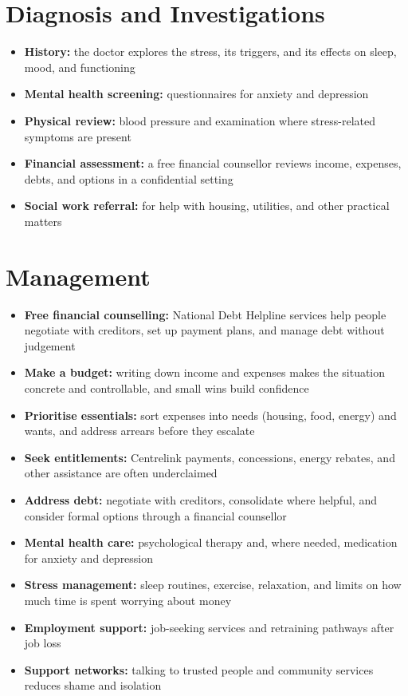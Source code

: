 \section*{Diagnosis and Investigations}
\begin{itemize}
    \item \textbf{History:} the doctor explores the stress, its triggers, and its effects on sleep, mood, and functioning
    \item \textbf{Mental health screening:} questionnaires for anxiety and depression
    \item \textbf{Physical review:} blood pressure and examination where stress-related symptoms are present
    \item \textbf{Financial assessment:} a free financial counsellor reviews income, expenses, debts, and options in a confidential setting
    \item \textbf{Social work referral:} for help with housing, utilities, and other practical matters
\end{itemize}

\section*{Management}
\begin{itemize}
    \item \textbf{Free financial counselling:} National Debt Helpline services help people negotiate with creditors, set up payment plans, and manage debt without judgement
    \item \textbf{Make a budget:} writing down income and expenses makes the situation concrete and controllable, and small wins build confidence
    \item \textbf{Prioritise essentials:} sort expenses into needs (housing, food, energy) and wants, and address arrears before they escalate
    \item \textbf{Seek entitlements:} Centrelink payments, concessions, energy rebates, and other assistance are often underclaimed
    \item \textbf{Address debt:} negotiate with creditors, consolidate where helpful, and consider formal options through a financial counsellor
    \item \textbf{Mental health care:} psychological therapy and, where needed, medication for anxiety and depression
    \item \textbf{Stress management:} sleep routines, exercise, relaxation, and limits on how much time is spent worrying about money
    \item \textbf{Employment support:} job-seeking services and retraining pathways after job loss
    \item \textbf{Support networks:} talking to trusted people and community services reduces shame and isolation
\end{itemize}

